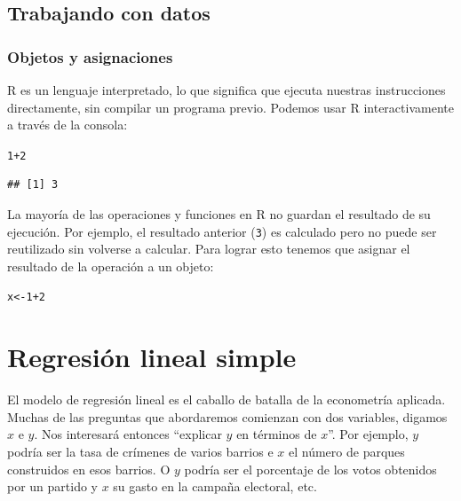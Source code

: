 \documentclass{report}\usepackage[]{graphicx}\usepackage[]{color}
\makeatletter
\newcommand{\hlnum}[1]{\textcolor[rgb]{0.686,0.059,0.569}{#1}}%
\newcommand{\hlopt}[1]{\textcolor[rgb]{0,0,0}{#1}}%
\newcommand{\hlstd}[1]{\textcolor[rgb]{0.345,0.345,0.345}{#1}}%
\newcommand{\hlkwb}[1]{\textcolor[rgb]{0.69,0.353,0.396}{#1}}%
\newenvironment{kframe}{%
 \def\at@end@of@kframe{}%
 \ifinner\ifhmode%
  \def\at@end@of@kframe{\end{minipage}}%
  \begin{minipage}{\columnwidth}%
 \fi\fi%
 \def\FrameCommand##1{\hskip\@totalleftmargin \hskip-\fboxsep
 \colorbox{shadecolor}{##1}\hskip-\fboxsep
     \hskip-\linewidth \hskip-\@totalleftmargin \hskip\columnwidth}%
 \MakeFramed {\advance\hsize-\width
   \@totalleftmargin\z@ \linewidth\hsize
   \@setminipage}}%
 {\par\unskip\endMakeFramed%
 \at@end@of@kframe}
\newenvironment{knitrout}{}{} %
\makeatother
\begin{document}
\section{Trabajando con datos}

\subsection{Objetos y asignaciones}

R es un lenguaje interpretado, lo que significa que ejecuta nuestras instrucciones directamente, sin compilar un programa previo. Podemos usar R interactivamente a través de la consola:
\begin{knitrout}
\color{fgcolor}\begin{kframe}
\begin{alltt}
\hlnum{1}\hlopt{+}\hlnum{2}
\end{alltt}
\begin{verbatim}
## [1] 3
\end{verbatim}
\end{kframe}
\end{knitrout}

La mayoría de las operaciones y funciones en R no guardan el resultado de su ejecución. Por ejemplo, el resultado anterior (\verb|3|) es calculado pero no puede ser reutilizado sin volverse a calcular. Para lograr esto tenemos que asignar el resultado de la operación a un objeto:
\begin{knitrout}
\color{fgcolor}\begin{kframe}
\begin{alltt}
\hlstd{x} \hlkwb{<-} \hlnum{1}\hlopt{+}\hlnum{2}
\end{alltt}
\end{kframe}
\end{knitrout}





\chapter{Regresión lineal simple}



El modelo de regresión lineal es el caballo de batalla de la econometría aplicada.
Muchas de las preguntas que abordaremos comienzan con dos variables, digamos $x$ e $y$. Nos interesará entonces ``explicar $y$ en términos de $x$''.
Por ejemplo, $y$ podría ser la tasa de crímenes de varios barrios e $x$ el número de parques construidos en esos barrios.
O $y$ podría ser el porcentaje de los votos obtenidos por un partido y $x$ su gasto en la campaña electoral, etc.
\end{document}
